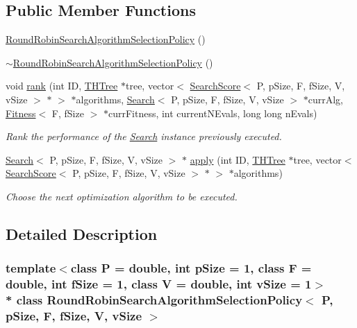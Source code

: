 \subsection*{Public Member Functions}
\begin{DoxyCompactItemize}
\item 
\hyperlink{classRoundRobinSearchAlgorithmSelectionPolicy_a5fcc6ac0ff768fd1f19ac21fee8a52ec}{Round\+Robin\+Search\+Algorithm\+Selection\+Policy} ()
\item 
\hyperlink{classRoundRobinSearchAlgorithmSelectionPolicy_a63d15df32ac13f67c4ea6641a96a040f}{$\sim$\+Round\+Robin\+Search\+Algorithm\+Selection\+Policy} ()
\item 
void \hyperlink{classRoundRobinSearchAlgorithmSelectionPolicy_a198c3aab64c2d008074846e39345524e}{rank} (int ID, \hyperlink{classTHTree}{T\+H\+Tree} $\ast$tree, vector$<$ \hyperlink{classSearchScore}{Search\+Score}$<$ P, p\+Size, F, f\+Size, V, v\+Size $>$ $\ast$ $>$ $\ast$algorithms, \hyperlink{classSearch}{Search}$<$ P, p\+Size, F, f\+Size, V, v\+Size $>$ $\ast$curr\+Alg, \hyperlink{structFitness}{Fitness}$<$ F, f\+Size $>$ $\ast$curr\+Fitness, int current\+N\+Evals, long long n\+Evals)
\begin{DoxyCompactList}\small\item\em Rank the performance of the \hyperlink{classSearch}{Search} instance previously executed. \end{DoxyCompactList}\item 
\hyperlink{classSearch}{Search}$<$ P, p\+Size, F, f\+Size, V, v\+Size $>$ $\ast$ \hyperlink{classRoundRobinSearchAlgorithmSelectionPolicy_ae9f87e0ce29bb51f1ef5ceca35bde79d}{apply} (int ID, \hyperlink{classTHTree}{T\+H\+Tree} $\ast$tree, vector$<$ \hyperlink{classSearchScore}{Search\+Score}$<$ P, p\+Size, F, f\+Size, V, v\+Size $>$ $\ast$ $>$ $\ast$algorithms)
\begin{DoxyCompactList}\small\item\em Choose the next optimization algorithm to be executed. \end{DoxyCompactList}\end{DoxyCompactItemize}


\subsection{Detailed Description}
\subsubsection*{template$<$class P = double, int p\+Size = 1, class F = double, int f\+Size = 1, class V = double, int v\+Size = 1$>$\\*
class Round\+Robin\+Search\+Algorithm\+Selection\+Policy$<$ P, p\+Size, F, f\+Size, V, v\+Size $>$}

